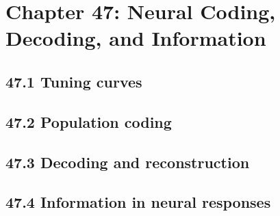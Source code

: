 \section{Chapter 47: Neural Coding, Decoding, and Information}

\subsection{47.1 Tuning curves}

\subsection{47.2 Population coding}

\subsection{47.3 Decoding and reconstruction}

\subsection{47.4 Information in neural responses}

\clearpage
